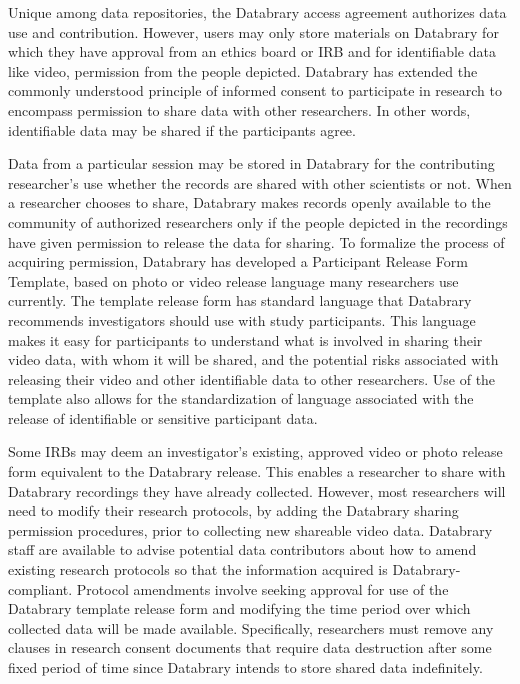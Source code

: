 \documentclass[letterpaper,man,apacite]{apa6}
\begin{document}
Unique among data repositories, the Databrary access agreement authorizes data use and contribution.
However, users may only store materials on Databrary for which they have approval from an ethics board or IRB and for identifiable data like video, permission from the people depicted. 
Databrary has extended the commonly understood principle of informed consent to participate in research to encompass permission to share data with other researchers.
In other words, identifiable data may be shared if the participants agree. 

Data from a particular session may be stored in Databrary for the contributing researcher’s use whether the records are shared with other scientists or not. 
When a researcher chooses to share, Databrary makes records openly available to the community of authorized researchers only if the people depicted in the recordings have given permission to release the data for sharing. 
To formalize the process of acquiring permission, Databrary has developed a Participant Release Form Template, based on photo or video release language many researchers use currently. 
The template release form has standard language that Databrary recommends investigators should use with study participants. 
This language makes it easy for participants to understand what is involved in sharing their video data, with whom it will be shared, and the potential risks associated with releasing their video and other identifiable data to other researchers. 
Use of the template also allows for the standardization of language associated with the release of identifiable or sensitive participant data.

Some IRBs may deem an investigator’s existing, approved video or photo release form equivalent to the Databrary release. 
This enables a researcher to share with Databrary recordings they have already collected. 
However, most researchers will need to modify their research protocols, by adding the Databrary sharing permission procedures, prior to collecting new shareable video data. 
Databrary staff are available to advise potential data contributors about how to amend existing research
protocols so that the information acquired is Databrary-compliant.
Protocol amendments involve seeking approval for use of the Databrary template release form and modifying the time period over which collected data will be made available. 
Specifically, researchers must remove any clauses in research consent documents that require data destruction after some fixed period of time since Databrary intends to store shared data indefinitely.
\end{document}
